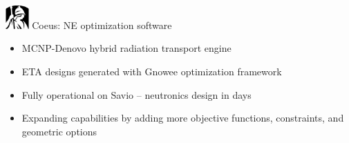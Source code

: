 \documentclass[xcolor=x11names,compress,handout]{beamer}
\renewcommand{\(}{\begin{columns}}
\renewcommand{\)}{\end{columns}}
\newcommand{\<}[1]{\begin{column}{#1}}
\renewcommand{\>}{\end{column}}
\begin{document}
\begin{frame}{\includegraphics[width=0.35in]{../figs/Coeus.jpg}  \hspace{0.25cm}  Coeus: NE optimization software}
  
  \begin{itemize}
    \item MCNP-Denovo hybrid radiation transport engine \cite{MCNP2008, ORNL2015, Evans2010}
    \item ETA designs generated with Gnowee optimization framework 
    \item Fully operational on Savio -- neutronics design in days
    \item Expanding capabilities by adding more objective functions, constraints, and geometric options     
  \end{itemize}
  
%  
\end{frame}
\end{document}
